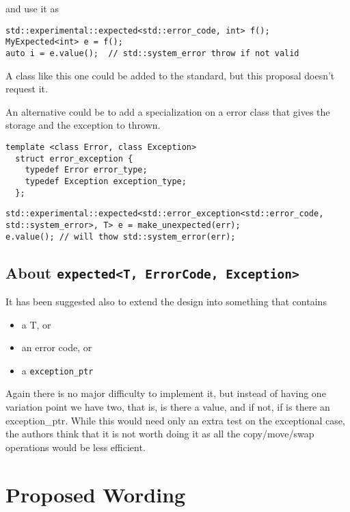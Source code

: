 \documentclass[a4paper,10pt]{article}
\newcommand{\cpp}[1]{\lstinline{#1}}
\begin{document}
and use it as

\begin{lstlisting}
std::experimental::expected<std::error_code, int> f();
MyExpected<int> e = f();
auto i = e.value();  // std::system_error throw if not valid
\end{lstlisting}

A class like this one could be added to the standard, but this proposal doesn't request it. 

An alternative could be to add a specialization on a error class that gives the storage and the exception to thrown.

\begin{lstlisting}
template <class Error, class Exception>
  struct error_exception {
    typedef Error error_type;
    typedef Exception exception_type;
  };
\end{lstlisting}

\begin{lstlisting}
std::experimental::expected<std::error_exception<std::error_code, std::system_error>, T> e = make_unexpected(err);
e.value(); // will thow std::system_error(err);
\end{lstlisting}


\subsection{About \cpp{expected<T, ErrorCode, Exception>}}

It has been suggested also to extend the design into something that contains 

\begin{itemize}
\item a T, or
\item an error code, or
\item a \cpp{exception_ptr} 
\end{itemize}

Again there is no major difficulty to implement it, but instead of having one variation point we have two, that is, is there a value, and if not, if is there an exception_ptr. While this would need only an extra test on the exceptional case, the authors think that it is not worth doing it as all the copy/move/swap operations would be less efficient. 

\section{Proposed Wording}
\end{document}
